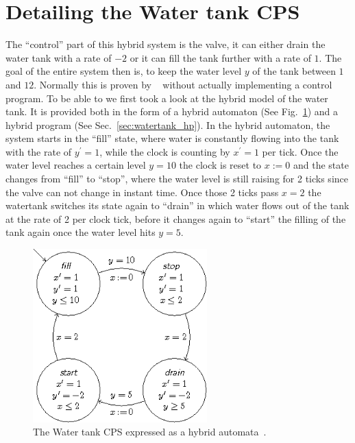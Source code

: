 \section{Detailing the Water tank CPS}
\label{sec:watertank:detail}

The ``control'' part of this hybrid system is the valve, it can either drain the water tank with a rate of \(-2\) or it can fill the tank further with a rate of \(1\). The goal of the entire system then is, to keep the water level \(y\) of the tank between \(1\) and \(12\). Normally this is proven by \keym~ without actually implementing a control program. To be able to we first took a look at the hybrid model of the water tank. It is provided both in the form of a hybrid automaton (See Fig.~\ref{fig:watertank_ha}) and a hybrid program (See Sec.~\ref{sec:watertank_hp}). In the hybrid automaton, the system starts in the ``fill'' state, where water is constantly flowing into the tank with the rate of \(y^{\prime} = 1\), while the clock is counting by \(x^{\prime}=1\) per tick. Once the water level reaches a certain level \(y=10\) the clock is reset to \(x:=0\) and the state changes from ``fill'' to ``stop'', where the water level is still raising for 2 ticks since the valve can not change in instant time. Once those 2 ticks pass \(x=2\) the watertank switches its state again to ``drain'' in which water flows out of the tank at the rate of 2 per clock tick, before it changes again to ``start'' the filling of the tank again once the water level hits \(y=5\).
\begin{figure}
	\centering
	\includegraphics[width=0.6\textwidth]{images/watertank_ha}
	\caption{The Water tank CPS expressed as a hybrid automata~\cite{keymaeraGuide}.}
	\label{fig:watertank_ha}
\end{figure}

